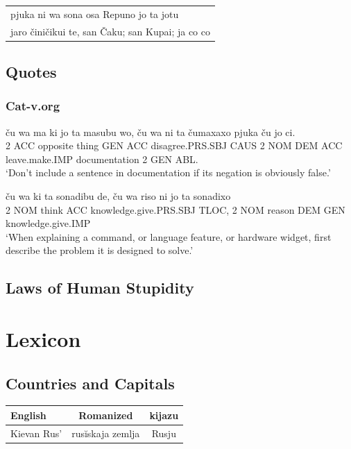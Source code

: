 \documentclass{clgrammar}
\begin{document}
\begin{tabular}{l}
	pjuka ni wa sona osa Repuno jo ta jotu\\
	jaro činičikui te, san Čaku; san Kupai; ja co co 



\end{tabular}


\chapter{Quotes}

\section{Cat-v.org}

\begin{exe}
	\ex
	\gll ču wa ma ki jo ta masubu wo, ču wa ni ta čumaxaxo pjuka ču jo ci.\\ 
	2 ACC opposite thing GEN ACC disagree.PRS.SBJ CAUS 2 NOM DEM ACC leave.make.IMP documentation 2 GEN ABL.\\
	\trans `Don't include a sentence in documentation if its negation is obviously false.'
\end{exe}

\begin{exe}
	\ex 
	\gll ču wa ki ta sonadibu de, ču wa riso ni jo ta sonadixo \\
	2 NOM think ACC knowledge.give.PRS.SBJ TLOC, 2 NOM reason DEM GEN knowledge.give.IMP \\ 
	\trans `When explaining a command, or language feature, or hardware widget, first describe the problem it is designed to solve.'
\end{exe}


\chapter{Laws of Human Stupidity}
\part{Lexicon}
\chapter{Countries and Capitals}
\begin{center}
\begin{tabular}{l|c|c}
	English & Romanized & kijazu \\
	\hline
	Kievan Rus' & rusĭskaja zemlja  & Rusju \\
\end{tabular}
\end{center}
\end{document}
